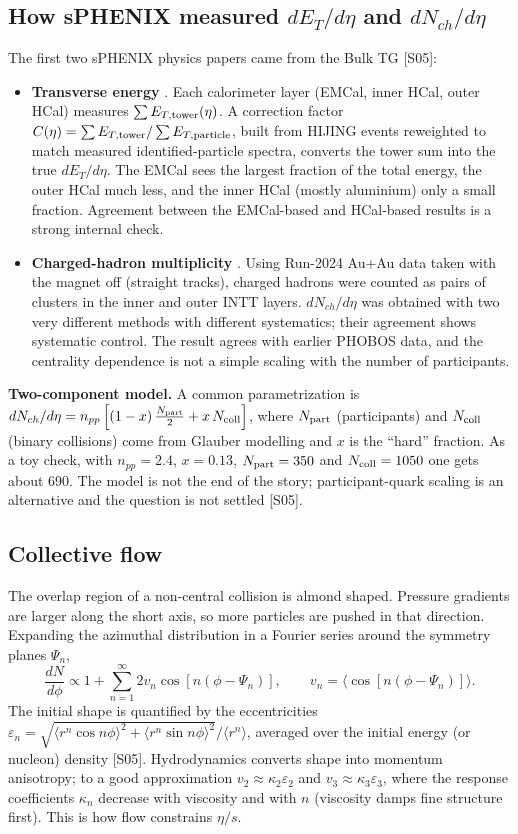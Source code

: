 \documentclass[11pt,letterpaper]{article}
\begin{document}
\subsection{How sPHENIX measured $dE_T/d\eta$ and $dN_{ch}/d\eta$}
The first two sPHENIX physics papers came from the Bulk TG [S05]:
\begin{itemize}
\item \textbf{Transverse energy} \cite{bulk2}. Each calorimeter layer (EMCal, inner HCal, outer HCal) measures
$\sum E_{T,\rm tower}(\eta)$. A correction factor $C(\eta)=\sum E_{T,\rm tower}/\sum E_{T,\rm particle}$, built from
HIJING events reweighted to match measured identified-particle spectra, converts the tower sum into the true
$dE_T/d\eta$. The EMCal sees the largest fraction of the total energy, the outer HCal much less, and the inner HCal
(mostly aluminium) only a small fraction. Agreement between the EMCal-based and HCal-based results is a strong internal check.
\item \textbf{Charged-hadron multiplicity} \cite{bulk1}. Using Run-2024 Au+Au data taken with the magnet off (straight tracks), charged hadrons were counted as pairs of clusters in the inner and outer INTT layers. $dN_{ch}/d\eta$ was obtained with two very different methods
with different systematics; their agreement shows systematic control. The result agrees with earlier PHOBOS data, and
the centrality dependence is not a simple scaling with the number of participants.
\end{itemize}
\textbf{Two-component model.} A common parametrization is
$dN_{ch}/d\eta=n_{pp}\left[(1-x)\,\frac{N_{\rm part}}{2}+x\,N_{\rm coll}\right]$, where $N_{\rm part}$ (participants) and
$N_{\rm coll}$ (binary collisions) come from Glauber modelling and $x$ is the ``hard'' fraction. As a toy check, with
$n_{pp}=2.4$, $x=0.13$, $N_{\rm part}=350$ and $N_{\rm coll}=1050$ one gets about 690. The model is not the end of the
story; participant-quark scaling is an alternative and the question is not settled [S05].

\subsection{Collective flow}
The overlap region of a non-central collision is almond shaped. Pressure gradients are larger along the short axis,
so more particles are pushed in that direction. Expanding the azimuthal distribution in a Fourier series around the
symmetry planes $\Psi_n$,
\begin{equation}
\frac{dN}{d\phi}\propto1+\sum_{n=1}^{\infty}2v_n\cos[n(\phi-\Psi_n)],\qquad v_n=\langle\cos[n(\phi-\Psi_n)]\rangle .
\label{eq:flow}
\end{equation}
The initial shape is quantified by the eccentricities
$\varepsilon_n=\sqrt{\langle r^n\cos n\phi\rangle^2+\langle r^n\sin n\phi\rangle^2}/\langle r^n\rangle$, averaged over the
initial energy (or nucleon) density [S05]. Hydrodynamics converts shape into momentum anisotropy; to a good
approximation $v_2\approx\kappa_2\varepsilon_2$ and $v_3\approx\kappa_3\varepsilon_3$, where the response coefficients
$\kappa_n$ decrease with viscosity and with $n$ (viscosity damps fine structure first). This is how flow constrains $\eta/s$.
\end{document}
